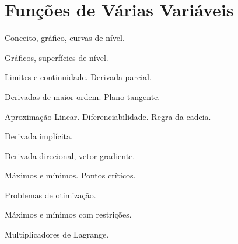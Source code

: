 \chapter{Funções de Várias Variáveis}

Conceito, gráfico, curvas de nível.

Gráficos, superfícies de nível.

Limites e continuidade. Derivada parcial.

Derivadas de maior ordem. Plano tangente.

Aproximação Linear. Diferenciabilidade. Regra da cadeia.

Derivada implícita.

Derivada direcional, vetor gradiente.

Máximos e mínimos. Pontos críticos.

Problemas de otimização.

Máximos e mínimos com restrições.

Multiplicadores de Lagrange.


